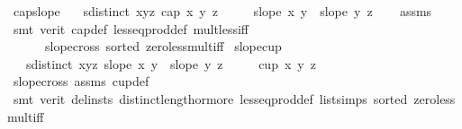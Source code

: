 \begin{isabellebody}
\endisatagproof
{\isafoldproof}%
%
\isadelimproof
\isanewline
%
\endisadelimproof
\isanewline
{}\isamarkupfalse%
\ cap{}{\isacharunderscore}{\kern0pt}slope{\isacharcolon}{\kern0pt}\isanewline
\ \ \ {\isachardoublequoteopen}sdistinct\ {\isacharbrackleft}{\kern0pt}x{\isacharcomma}{\kern0pt}y{\isacharcomma}{\kern0pt}z{\isacharbrackright}{\kern0pt}{\isachardoublequoteclose}\ {\isachardoublequoteopen}cap{}\ x\ y\ z{\isachardoublequoteclose}\isanewline
\ \ \ \ \ {\isachardoublequoteopen}slope\ x\ y\ {\isachargreater}{\kern0pt}\ slope\ y\ z{\isachardoublequoteclose}\isanewline
%
\isadelimproof
\ \ %
\endisadelimproof
%
\isatagproof
{}\isamarkupfalse%
\ assms\isanewline
\ \ \isamarkupfalse%
\ {\isacharparenleft}{\kern0pt}smt\ {\isacharparenleft}{\kern0pt}verit{\isacharparenright}{\kern0pt}\ cap{}{\isacharunderscore}{\kern0pt}def\ less{\isacharunderscore}{\kern0pt}eq{\isacharunderscore}{\kern0pt}prod{\isacharunderscore}{\kern0pt}def\ mult{\isacharunderscore}{\kern0pt}less{\isacharunderscore}{\kern0pt}{}{\isacharunderscore}{\kern0pt}iff\isanewline
\ \ \ \ \ \ slope{\isacharunderscore}{\kern0pt}cross{}\ sorted{}\ zero{\isacharunderscore}{\kern0pt}less{\isacharunderscore}{\kern0pt}mult{\isacharunderscore}{\kern0pt}iff{\isacharparenright}{\kern0pt}%
\endisatagproof
{\isafoldproof}%
%
\isadelimproof
\isanewline
%
\endisadelimproof
\isanewline
{}\isamarkupfalse%
\ slope{\isacharunderscore}{\kern0pt}cup{}{\isacharcolon}{\kern0pt}\isanewline
\ \ \ {\isachardoublequoteopen}sdistinct\ {\isacharbrackleft}{\kern0pt}x{\isacharcomma}{\kern0pt}y{\isacharcomma}{\kern0pt}z{\isacharbrackright}{\kern0pt}{\isachardoublequoteclose}\ {\isachardoublequoteopen}slope\ x\ y\ {\isacharless}{\kern0pt}\ slope\ y\ z{\isachardoublequoteclose}\isanewline
\ \ \ \ \ {\isachardoublequoteopen}cup{}\ x\ y\ z{\isachardoublequoteclose}%
\isadelimproof
\ %
\endisadelimproof
%
\isatagproof
{}\isamarkupfalse%
\ slope{\isacharunderscore}{\kern0pt}cross{}\ assms{\isacharparenleft}{\kern0pt}{}{\isacharcomma}{\kern0pt}{}{\isacharparenright}{\kern0pt}\ cup{}{\isacharunderscore}{\kern0pt}def\isanewline
\ \ \isamarkupfalse%
\ {\isacharparenleft}{\kern0pt}smt\ {\isacharparenleft}{\kern0pt}verit{\isacharcomma}{\kern0pt}\ del{\isacharunderscore}{\kern0pt}insts{\isacharparenright}{\kern0pt}\ distinct{\isacharunderscore}{\kern0pt}length{\isacharunderscore}{\kern0pt}{}{\isacharunderscore}{\kern0pt}or{\isacharunderscore}{\kern0pt}more\ less{\isacharunderscore}{\kern0pt}eq{\isacharunderscore}{\kern0pt}prod{\isacharunderscore}{\kern0pt}def\ list{\isachardot}{\kern0pt}simps{\isacharparenleft}{\kern0pt}{}{\isacharparenright}{\kern0pt}\ sorted{}\ zero{\isacharunderscore}{\kern0pt}less{\isacharunderscore}{\kern0pt}mult{\isacharunderscore}{\kern0pt}iff{\isacharparenright}{\kern0pt}%

\end{isabellebody}
